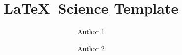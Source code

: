 \documentclass[a4paper]{article}
\begin{document}
	\title{\LaTeX\ Science Template}
	\author{Author 1 \and Author 2}
	\maketitle
	
	\pagebreak
	
	\tableofcontents
	\pagebreak
	
\end{document}
